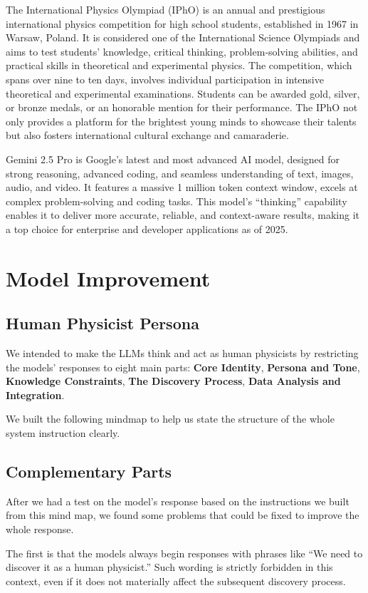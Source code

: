 \documentclass[12pt]{article}
\begin{document}
The International Physics Olympiad (IPhO) is an annual and prestigious international physics competition for high school students, established in 1967 in Warsaw, Poland. It is considered one of the International Science Olympiads and aims to test students' knowledge, critical thinking, problem-solving abilities, and practical skills in theoretical and experimental physics. The competition, which spans over nine to ten days, involves individual participation in intensive theoretical and experimental examinations. Students can be awarded gold, silver, or bronze medals, or an honorable mention for their performance. The IPhO not only provides a platform for the brightest young minds to showcase their talents but also fosters international cultural exchange and camaraderie.

Gemini 2.5 Pro is Google’s latest and most advanced AI model, designed for strong reasoning, advanced coding, and seamless understanding of text, images, audio, and video. It features a massive 1 million token context window, excels at complex problem-solving and coding tasks. This model’s “thinking” capability enables it to deliver more accurate, reliable, and context-aware results, making it a top choice for enterprise and developer applications as of 2025. 

\section{Model Improvement}
\subsection{Human Physicist Persona}
We intended to make the LLMs think and act as human physicists by restricting the models' responses to eight main parts: \textbf{Core Identity}, \textbf{Persona and Tone}, \textbf{Knowledge Constraints}, \textbf{The Discovery Process}, \textbf{Data Analysis and Integration}.

We built the following mindmap to help us state the structure of the whole system instruction clearly. 

\subsection{Complementary Parts}
After we had a test on the model’s response based on the instructions we built from this mind map, we found some problems that could be fixed to improve the whole response.  

The first is that the models always begin responses with phrases like “We need to discover it as a human physicist.” Such wording is strictly forbidden in this context, even if it does not materially affect the subsequent discovery process.
\end{document}
